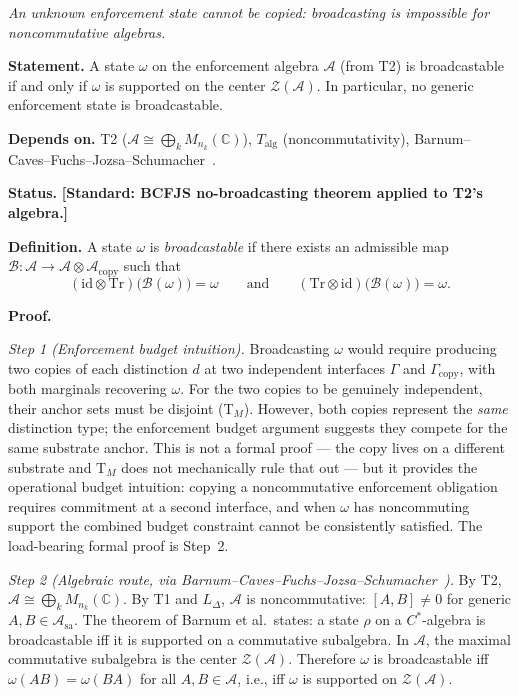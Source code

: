 \documentclass[11pt]{article}
\theoremstyle{remark}
\begin{document}
\begin{tcolorbox}[apfbox, title={Theorem $T_{\mathrm{NB}}$ (No-Broadcasting)}]
\textit{An unknown enforcement state cannot be copied: broadcasting is impossible for noncommutative algebras.}

\smallskip\noindent\textbf{Statement.}  A state $\omega$ on the enforcement algebra $\mathcal{A}$ (from T2) is broadcastable if and only if $\omega$ is supported on the center $\mathcal{Z}(\mathcal{A})$.  In particular, no generic enforcement state is broadcastable.

\smallskip\noindent\textbf{Depends on.}  T2 ($\mathcal{A} \cong \bigoplus_k M_{n_k}(\mathbb{C})$), $T_{\mathrm{alg}}$ (noncommutativity), Barnum--Caves--Fuchs--Jozsa--Schumacher~\cite{Barnum1996}.

\smallskip\noindent\textbf{Status.}  \textbf{[Standard: BCFJS no-broadcasting theorem applied to T2's algebra.]}

\smallskip\noindent\textbf{Definition.}  A state $\omega$ is \emph{broadcastable} if there exists an admissible map $\mathcal{B}: \mathcal{A} \to \mathcal{A} \otimes \mathcal{A}_{\mathrm{copy}}$ such that
\[
(\mathrm{id} \otimes \mathrm{Tr})\bigl(\mathcal{B}(\omega)\bigr) = \omega
\qquad\text{and}\qquad
(\mathrm{Tr} \otimes \mathrm{id})\bigl(\mathcal{B}(\omega)\bigr) = \omega.
\]

\smallskip\noindent\textbf{Proof.}

\textit{Step 1 (Enforcement budget intuition).}  Broadcasting $\omega$ would require producing two copies of each distinction $d$ at two independent interfaces $\Gamma$ and $\Gamma_{\mathrm{copy}}$, with both marginals recovering $\omega$.  For the two copies to be genuinely independent, their anchor sets must be disjoint (T$_M$).  However, both copies represent the \emph{same} distinction type; the enforcement budget argument suggests they compete for the same substrate anchor.  This is not a formal proof — the copy lives on a different substrate and T$_M$ does not mechanically rule that out — but it provides the operational budget intuition: copying a noncommutative enforcement obligation requires commitment at a second interface, and when $\omega$ has noncommuting support the combined budget constraint cannot be consistently satisfied.  The load-bearing formal proof is Step~2.

\textit{Step 2 (Algebraic route, via Barnum--Caves--Fuchs--Jozsa--Schumacher~\cite{Barnum1996}).}  By T2, $\mathcal{A} \cong \bigoplus_k M_{n_k}(\mathbb{C})$.  By T1 and $L_\Delta$, $\mathcal{A}$ is noncommutative: $[A, B] \ne 0$ for generic $A, B \in \mathcal{A}_{\mathrm{sa}}$.  The theorem of Barnum et al.\ states: a state $\rho$ on a $C^*$-algebra is broadcastable iff it is supported on a commutative subalgebra.  In $\mathcal{A}$, the maximal commutative subalgebra is the center $\mathcal{Z}(\mathcal{A})$.  Therefore $\omega$ is broadcastable iff $\omega(AB) = \omega(BA)$ for all $A, B \in \mathcal{A}$, i.e., iff $\omega$ is supported on $\mathcal{Z}(\mathcal{A})$.


\end{tcolorbox}
\end{document}
